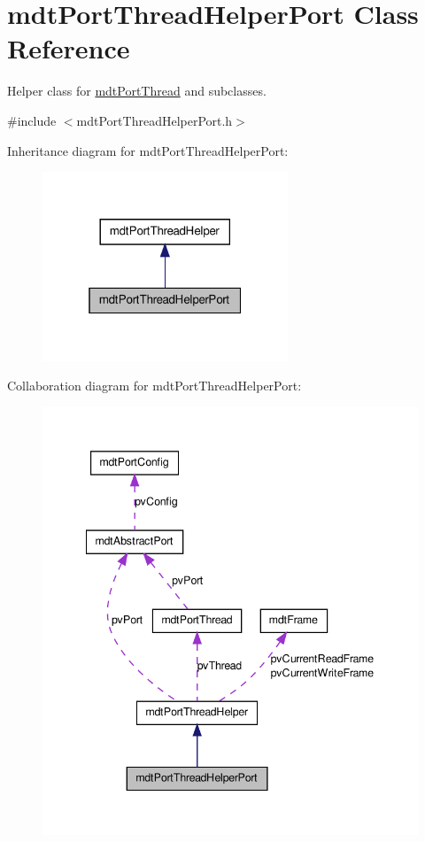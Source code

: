 \hypertarget{classmdt_port_thread_helper_port}{
\section{mdtPortThreadHelperPort Class Reference}
\label{classmdt_port_thread_helper_port}
}


Helper class for \hyperlink{classmdt_port_thread}{mdtPortThread} and subclasses.  




{\ttfamily \#include $<$mdtPortThreadHelperPort.h$>$}



Inheritance diagram for mdtPortThreadHelperPort:
\nopagebreak
\begin{figure}[H]
\begin{center}
\leavevmode
\includegraphics[width=208pt]{classmdt_port_thread_helper_port__inherit__graph}
\end{center}
\end{figure}


Collaboration diagram for mdtPortThreadHelperPort:
\nopagebreak
\begin{figure}[H]
\begin{center}
\leavevmode
\includegraphics[width=342pt]{classmdt_port_thread_helper_port__coll__graph}
\end{center}
\end{figure}
